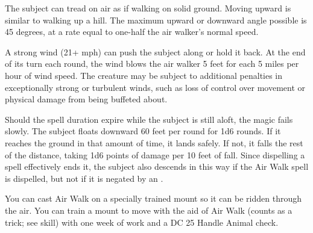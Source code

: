 \spelldatastart
{}
\spelldataend

The subject can tread on air as if walking on solid ground. Moving upward is similar to walking up a hill. The maximum upward or downward angle possible is 45 degrees, at a rate equal to one-half the air walker's normal speed.

A strong wind (21+ mph) can push the subject along or hold it back. At the end of its turn each round, the wind blows the air walker 5 feet for each 5 miles per hour of wind speed. The creature may be subject to additional penalties in exceptionally strong or turbulent winds, such as loss of control over movement or physical damage from being buffeted about.

Should the spell duration expire while the subject is still aloft, the magic fails slowly. The subject floats downward 60 feet per round for 1d6 rounds. If it reaches the ground in that amount of time, it lands safely. If not, it falls the rest of the distance, taking 1d6 points of damage per 10 feet of fall. Since dispelling a spell effectively ends it, the subject also descends in this way if the Air Walk spell is dispelled, but not if it is negated by an .

You can cast Air Walk on a specially trained mount so it can be ridden through the air. You can train a mount to move with the aid of Air Walk (counts as a trick; see  skill) with one week of work and a DC 25 Handle Animal check.
\spellfoot

